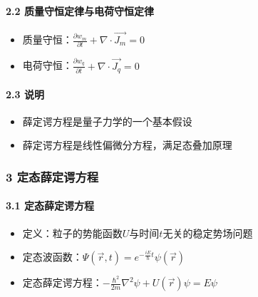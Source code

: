 \documentclass[UTF8,twocolumn]{ctexart}
\providecommand{\tightlist}{%
  \setlength{\itemsep}{0pt}\setlength{\parskip}{0pt}}
\let\oldparagraph\paragraph
\renewcommand{\paragraph}[1]{\oldparagraph{#1}\mbox{}}
\begin{document}
\hypertarget{ux8d28ux91cfux5b88ux6052ux5b9aux5f8bux4e0eux7535ux8377ux5b88ux6052ux5b9aux5f8b}{%
\paragraph{{ }2.2
质量守恒定律与电荷守恒定律}\label{ux8d28ux91cfux5b88ux6052ux5b9aux5f8bux4e0eux7535ux8377ux5b88ux6052ux5b9aux5f8b}}

\begin{itemize}
\tightlist
\item
  质量守恒：\(\frac{\partial w_m}{\partial t}+\nabla\cdot\vec{J_m}=0\)
\item
  电荷守恒：\(\frac{\partial w_q}{\partial t}+\nabla\cdot\vec{J_q}=0\)
\end{itemize}

\hypertarget{ux8bf4ux660e}{%
\paragraph{{ }2.3 说明}\label{ux8bf4ux660e}}

\begin{itemize}
\tightlist
\item
  薛定谔方程是量子力学的一个基本假设
\item
  薛定谔方程是线性偏微分方程，满足态叠加原理
\end{itemize}

\hypertarget{ux5b9aux6001ux859bux5b9aux8c14ux65b9ux7a0b}{%
\subsubsection{3
定态薛定谔方程}\label{ux5b9aux6001ux859bux5b9aux8c14ux65b9ux7a0b}}

\hypertarget{ux5b9aux6001ux859bux5b9aux8c14ux65b9ux7a0b-1}{%
\paragraph{{ }3.1
定态薛定谔方程}\label{ux5b9aux6001ux859bux5b9aux8c14ux65b9ux7a0b-1}}

\begin{itemize}
\tightlist
\item
  定义：粒子的势能函数\(U\)与时间\(t\)无关的稳定势场问题
\item
  定态波函数：\(\Psi(\vec{r},t)=e^{-\frac{iE}{\hbar}t}\psi(\vec{r})\)
\item
  定态薛定谔方程：\(-\frac{\hbar^2}{2m}\nabla^2\psi+U(\vec{r})\psi=E\psi\)
\end{itemize}
\end{document}

